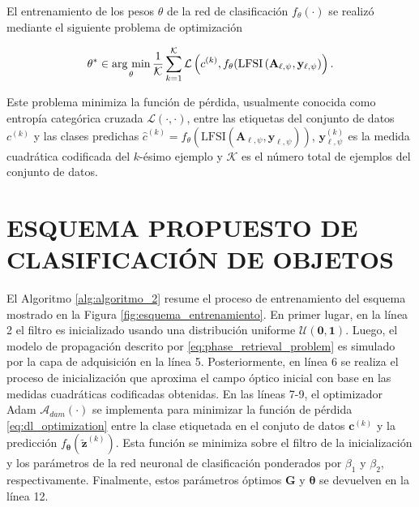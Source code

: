 El entrenamiento de los pesos $\theta$ de la red de clasificación $f_\theta(\cdot)$ se realizó mediante el siguiente problema de optimización

\begin{equation}
    \mathbf{\theta}^* \in  \operatorname*{arg \ min}_{\mathbf{\theta}} \frac{1}{\mathcal{K}}\sum_{k = 1}^{\mathcal{K}} \mathcal{L}\left( c^{(k)}, f_\theta(\mathrm{LFSI}\left(\mathbf{A}_{\ell,\psi},\mathbf{y}_{\ell, \psi}\right)\right).
    \label{eq:dl_optimization}
\end{equation}

Este problema minimiza la función de pérdida, usualmente conocida como entropía categórica cruzada $\mathcal{L}(\cdot, \cdot)$, entre las etiquetas del conjunto de datos $c^{(k)}$ y las clases predichas $\hat{c}^{(k)} = f_\theta(\mathrm{LFSI}\left(\mathbf{A}_{\ell,\psi},\mathbf{y}_{\ell, \psi}\right))$, $\mathbf{y}_{\ell, \psi}^{(k)}$ es la medida cuadrática codificada del $k$-ésimo ejemplo y $\mathcal{K}$ es el número total de ejemplos del conjunto de datos.


\section{ESQUEMA PROPUESTO DE CLASIFICACIÓN DE OBJETOS}

El Algoritmo \ref{alg:algoritmo_2} resume el proceso de entrenamiento del esquema mostrado en la Figura \ref{fig:esquema_entrenamiento}. En primer lugar, en la línea 2 el filtro es inicializado usando una distribución uniforme $\mathcal{U}(\mathbf{0},\mathbf{1})$. Luego, el modelo de propagación descrito por \eqref{eq:phase_retrieval_problem} es simulado por la capa de adquisición en la línea 5. Posteriormente, en línea 6 se realiza el proceso de inicialización que aproxima el campo óptico inicial con base en las medidas cuadráticas codificadas obtenidas. En las líneas 7-9, el optimizador Adam $\mathcal{A}_{dam}(\cdot)$ se implementa para minimizar la función de pérdida \eqref{eq:dl_optimization} entre la clase etiquetada en el conjuto de datos ${\mathbf{c}}^{(k)}$ y la predicción $f_{\boldsymbol{\theta}}\left(\tilde{\mathbf{z}}^{(k)}\right)$. Esta función se minimiza sobre el filtro de la inicialización y los parámetros de la red neuronal de clasificación ponderados por $\beta_1$ y $\beta_2$, respectivamente. Finalmente, estos parámetros óptimos $\mathbf{G}$ y $\boldsymbol{\theta}$ se devuelven en la línea 12.


